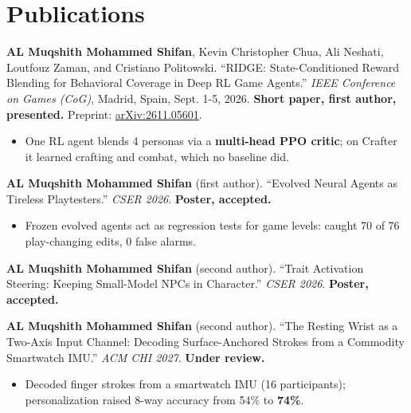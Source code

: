 \documentclass[letterpaper,10pt]{article}
\begin{document}
\section{Publications}
\textbf{AL Muqshith Mohammed Shifan}, Kevin Christopher Chua, Ali Neshati, Loutfouz Zaman, and Cristiano Politowski.
``RIDGE: State-Conditioned Reward Blending for Behavioral Coverage in Deep RL Game Agents.''
\textit{IEEE Conference on Games (CoG)}, Madrid, Spain, Sept. 1-5, 2026. \textbf{Short paper, first author, presented.}
Preprint: \href{https://arxiv.org/abs/2611.05601}{arXiv:2611.05601}.
\begin{itemize}
  \item One RL agent blends 4 personas via a \textbf{multi-head PPO critic}; on Crafter it learned crafting and combat, which no baseline did.
\end{itemize}
\vspace{2pt}
\textbf{AL Muqshith Mohammed Shifan} (first author). ``Evolved Neural Agents as Tireless Playtesters.'' \textit{CSER 2026}. \textbf{Poster, accepted.}
\begin{itemize}
  \item Frozen evolved agents act as regression tests for game levels: caught 70 of 76 play-changing edits, 0 false alarms.
\end{itemize}
\vspace{2pt}
\textbf{AL Muqshith Mohammed Shifan} (second author). ``Trait Activation Steering: Keeping Small-Model NPCs in Character.'' \textit{CSER 2026}. \textbf{Poster, accepted.}\par
\vspace{2pt}
\textbf{AL Muqshith Mohammed Shifan} (second author).
``The Resting Wrist as a Two-Axis Input Channel: Decoding Surface-Anchored Strokes from a Commodity Smartwatch IMU.''
\textit{ACM CHI 2027}. \textbf{Under review.}
\begin{itemize}
  \item Decoded finger strokes from a smartwatch IMU (16 participants); personalization raised 8-way accuracy from 54\% to \textbf{74\%}.
\end{itemize}

\end{document}
